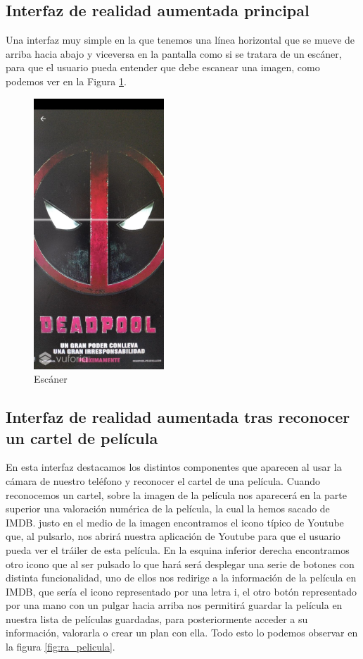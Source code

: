 \subsection{Interfaz de realidad aumentada principal}
\label{makereference3.4.4}
Una interfaz muy simple en la que tenemos una línea horizontal que se mueve de arriba hacia abajo y viceversa en la pantalla como si se tratara de un escáner, para que el usuario
pueda entender que debe escanear una imagen, como podemos ver en la Figura \ref{fig:escaner}.
\begin{figure}[H]
    \centering
    \includegraphics[height=4in]{figures/escaner.jpg}
    \caption{Escáner}
    \label{fig:escaner}
\end{figure}
\subsection{Interfaz de realidad aumentada tras reconocer un cartel de película}
\label{makereference3.4.5}
En esta interfaz destacamos los distintos componentes que aparecen al usar la cámara de nuestro teléfono y reconocer el cartel de una película.
Cuando reconocemos un cartel, sobre la imagen de la película nos aparecerá en la parte superior una valoración numérica de la película, la cual la hemos 
sacado de IMDB. justo en el medio de la imagen encontramos el icono típico de Youtube que, al pulsarlo, nos abrirá nuestra aplicación de Youtube para que
el usuario pueda ver el tráiler de esta película. En la esquina inferior derecha encontramos otro icono que al ser pulsado lo que hará será desplegar una serie de botones con distinta funcionalidad,
uno de ellos nos redirige a la información de la película en IMDB, que sería el icono representado por una letra i, el otro botón representado por una mano con un pulgar hacia arriba nos permitirá
guardar la película en nuestra lista de películas guardadas, para posteriormente acceder a su información, valorarla o crear un plan con ella. Todo esto lo podemos observar en la figura \ref{fig:ra_pelicula}.

